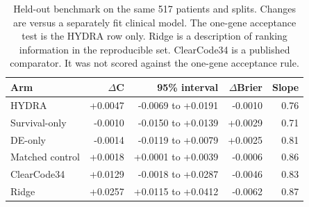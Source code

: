 \begin{table}[htbp]
\centering
\caption{Held-out benchmark on the same 517 patients and splits. Changes are versus a separately fit clinical model. The one-gene acceptance test is the HYDRA row only. Ridge is a description of ranking information in the reproducible set. ClearCode34 is a published comparator. It was not scored against the one-gene acceptance rule.}
\label{tab:benchmark}
\begin{tabular}{lrrrr}
\toprule
Arm & $\Delta$C & 95\% interval & $\Delta$Brier & Slope \\
\midrule
HYDRA & +0.0047 & -0.0069 to +0.0191 & -0.0010 & 0.76 \\
Survival-only & -0.0010 & -0.0150 to +0.0139 & +0.0029 & 0.71 \\
DE-only & -0.0014 & -0.0119 to +0.0079 & +0.0025 & 0.81 \\
Matched control & +0.0018 & +0.0001 to +0.0039 & -0.0006 & 0.86 \\
ClearCode34 & +0.0129 & -0.0018 to +0.0287 & -0.0046 & 0.83 \\
Ridge & +0.0257 & +0.0115 to +0.0412 & -0.0062 & 0.87 \\
\bottomrule
\end{tabular}
\end{table}

